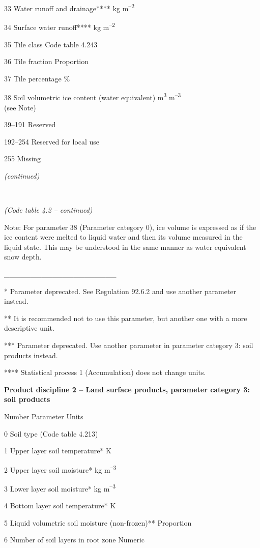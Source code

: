 33 Water runoff and drainage**** kg m\textsuperscript{--2}

34 Surface water runoff**** kg m\textsuperscript{--2}

35 Tile class Code table 4.243

36 Tile fraction Proportion

37 Tile percentage \%

38 Soil volumetric ice content (water equivalent) m\textsuperscript{3} m\textsuperscript{--3}\\
(see Note)

39--191 Reserved

192--254 Reserved for local use

255 Missing

\emph{(continued)}

\emph{\\
}

\emph{(Code table 4.2 -- continued)}

Note: For parameter 38 (Parameter category 0), ice volume is expressed as if the ice content were melted to liquid water and then its volume measured in the liquid state. This may be understood in the same manner as water equivalent snow depth.

\_\_\_\_\_\_\_\_\_\_\_\_\_\_\_\_\_\_\_\_\_

* Parameter deprecated. See Regulation 92.6.2 and use another parameter instead.

** It is recommended not to use this parameter, but another one with a more descriptive unit.

*** Parameter deprecated. Use another parameter in parameter category 3: soil products instead.

**** Statistical process 1 (Accumulation) does not change units.

\textbf{Product discipline 2 -- Land surface products, parameter category 3: soil products}

Number Parameter Units

0 Soil type (Code table 4.213)

1 Upper layer soil temperature* K

2 Upper layer soil moisture* kg m\textsuperscript{--3}

3 Lower layer soil moisture* kg m\textsuperscript{--3}

4 Bottom layer soil temperature* K

5 Liquid volumetric soil moisture (non-frozen)** Proportion

6 Number of soil layers in root zone Numeric

